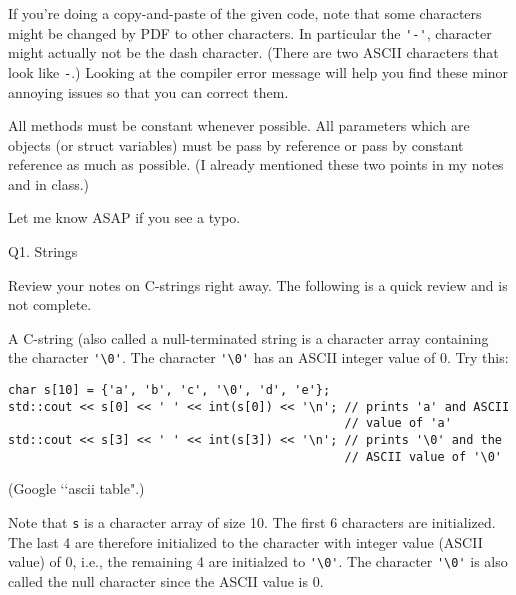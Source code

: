 If you're doing a copy-and-paste of the given code,
note that some characters might be changed by
PDF to other characters. In particular the \verb!'-'!,
character might actually not be the dash character.
(There are two ASCII characters that look like \verb!-!.)
Looking
at the compiler error message will help you find these minor annoying issues so that you can correct
them.

All methods must be constant whenever possible.
All parameters which are objects (or struct
variables) must be pass by reference or pass by constant reference
as much as possible.
(I already mentioned these two points in my notes and in class.)

Let me know ASAP if you see a typo.





\newpage
Q1. Strings

Review your notes on C-strings right away. The following is a quick review and
is not complete.

A C-string (also called a null-terminated string is a character array
containing the character \verb!'\0'!. The 
character \verb!'\0'! has an ASCII integer value of 0. Try this:

{\small
\begin{Verbatim}[frame=single, commandchars = \~\@\!]
char s[10] = {'a', 'b', 'c', '\0', 'd', 'e'};
std::cout << s[0] << ' ' << int(s[0]) << '\n'; // prints 'a' and ASCII
                                               // value of 'a'
std::cout << s[3] << ' ' << int(s[3]) << '\n'; // prints '\0' and the
                                               // ASCII value of '\0'
\end{Verbatim}
}
(Google \lq\lq ascii table".)

Note that \verb!s! is a character array of size 10.
The first 6 characters are initialized. The last 4 are therefore
initialized to the character with integer value (ASCII value) of 0, i.e.,
the remaining 4 are initialzed to
\verb!'\0'!. The character \verb!'\0'! is also called the null character
since the ASCII value is 0.

